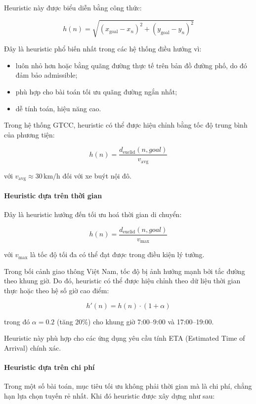 Heuristic này được biểu diễn bằng công thức:

\[
h(n) = \sqrt{(x_{\text{goal}} - x_{n})^2 + (y_{\text{goal}} - y_{n})^2}
\]

Đây là heuristic phổ biến nhất trong các hệ thống điều hướng vì:

\begin{itemize}
    \item luôn nhỏ hơn hoặc bằng quãng đường thực tế trên bản đồ đường phố, do đó đảm bảo admissible;
    \item phù hợp cho bài toán tối ưu quãng đường ngắn nhất;
    \item dễ tính toán, hiệu năng cao.
\end{itemize}

Trong hệ thống GTCC, heuristic có thể được hiệu chỉnh bằng tốc độ trung bình của phương tiện:

\[
h(n) = \frac{d_{\text{euclid}}(n, goal)}{v_{\text{avg}}}
\]

với $v_{\text{avg}} \approx 30\,\text{km/h}$ đối với xe buýt nội đô.

\paragraph{Heuristic dựa trên thời gian}

Đây là heuristic hướng đến tối ưu hoá thời gian di chuyển:

\[
h(n) = \frac{d_{\text{euclid}}(n, goal)}{v_{\text{max}}}
\]

với $v_{\text{max}}$ là tốc độ tối đa có thể đạt được trong điều kiện lý tưởng.

Trong bối cảnh giao thông Việt Nam, tốc độ bị ảnh hưởng mạnh bởi tắc đường theo khung giờ. Do đó, heuristic có thể được hiệu chỉnh theo dữ liệu thời gian thực hoặc theo hệ số giờ cao điểm:

\[
h'(n) = h(n) \cdot (1 + \alpha)
\]

trong đó $\alpha = 0.2$ (tăng 20\%) cho khung giờ 7:00–9:00 và 17:00–19:00.

Heuristic này phù hợp cho các ứng dụng yêu cầu tính ETA (Estimated Time of Arrival) chính xác.

\paragraph{Heuristic dựa trên chi phí}

Trong một số bài toán, mục tiêu tối ưu không phải thời gian mà là chi phí, chẳng hạn lựa chọn tuyến rẻ nhất. Khi đó heuristic được xây dựng như sau:

